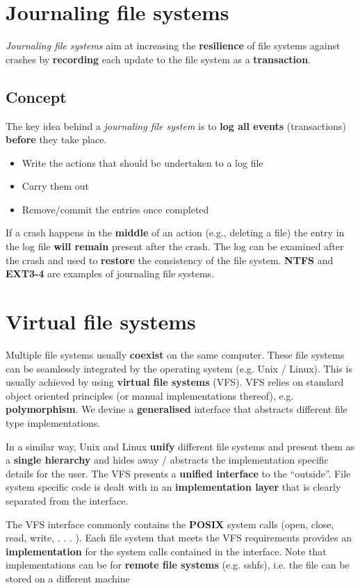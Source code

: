 \documentclass{article}
\begin{document}
\section{Journaling file systems}
\begin{flushleft}
\textit{Journaling file systems} aim at increasing the \textbf{resilience} of file systems against crashes by \textbf{recording} each update to the file system as a \textbf{transaction}.
\end{flushleft}

\subsection{Concept}
\begin{flushleft}
The key idea behind a \textit{journaling file system} is to \textbf{log all events} (transactions) \textbf{before} they take place.
\begin{itemize}
	\item Write the actions that should be undertaken to a log file
	\item Carry them out
	\item Remove/commit the entries once completed 
\end{itemize}
If a crash happens in the \textbf{middle} of an action (e.g., deleting a file) the entry in the log file \textbf{will remain} present after the crash. The log can be examined after the crash and used to \textbf{restore} the consistency of the file system. \textbf{NTFS} and \textbf{EXT3-4} are examples of journaling file systems.
\end{flushleft}

\section{Virtual file systems}
\begin{flushleft}
Multiple file systems usually \textbf{coexist} on the same computer. These file systems can be seamlessly integrated by the operating system (e.g. Unix / Linux). This is usually achieved by using \textbf{virtual file systems} (VFS). VFS relies on standard object oriented principles (or manual implementations thereof), e.g. \textbf{polymorphism}. We devine a \textbf{generalised} interface that abstracts different file type implementations.\bigskip

In a similar way, Unix and Linux \textbf{unify} different file systems and present them as a \textbf{single hierarchy} and hides away / abstracts the implementation specific details for the user. The VFS presents a \textbf{unified interface} to the “outside”. File system specific code is dealt with in an \textbf{implementation layer} that is clearly separated from the interface.\bigskip

The VFS interface commonly contains the \textbf{POSIX} system calls (open, close, read, write, . . . ). Each file system that meets the VFS requirements provides an \textbf{implementation} for the system calls contained in the interface. Note that implementations can be for \textbf{remote file systems} (e.g. sshfs), i.e. the file can be stored on a different machine
\end{flushleft}
\end{document}

